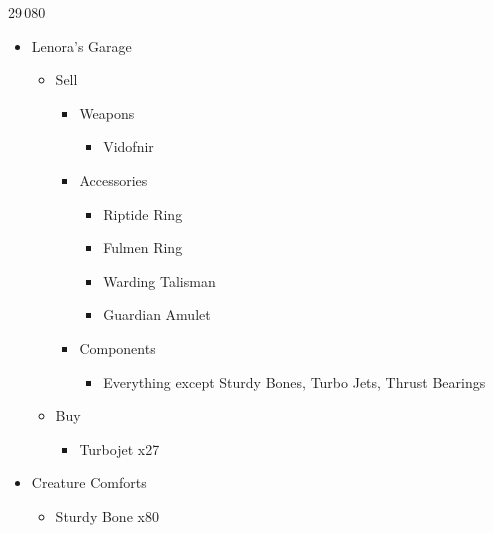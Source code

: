 	\begin{shop}{29\,080}
		\begin{itemize}
			\item Lenora's Garage
			      \begin{itemize}
				      \item Sell
				            \begin{itemize}
					            \item Weapons
					                  \begin{itemize}
						                  \item Vidofnir
					                  \end{itemize}
					            \item Accessories
					                  \begin{itemize}
						                  \item Riptide Ring
						                  \item Fulmen Ring
						                  \item Warding Talisman
						                  \item Guardian Amulet
					                  \end{itemize}
					            \item Components
					                  \begin{itemize}
						                  \item Everything except Sturdy Bones, Turbo Jets, Thrust Bearings
					                  \end{itemize}
				            \end{itemize}
				      \item Buy
				            \begin{itemize}
					            \item Turbojet x27
				            \end{itemize}
			      \end{itemize}
			\item Creature Comforts
			      \begin{itemize}
				      \item Sturdy Bone x80
			      \end{itemize}
		\end{itemize}
	\end{shop}
	
